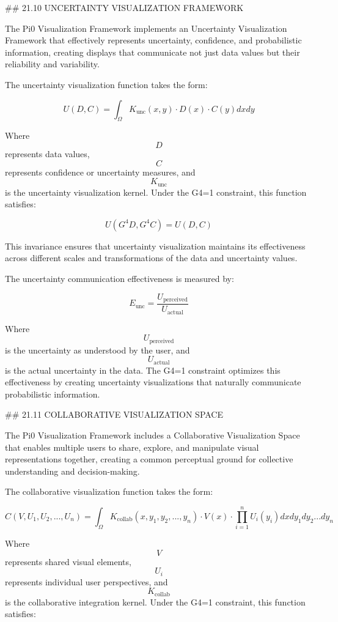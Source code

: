 ## 21.10 UNCERTAINTY VISUALIZATION FRAMEWORK

The Pi0 Visualization Framework implements an Uncertainty Visualization Framework that effectively represents uncertainty, confidence, and probabilistic information, creating displays that communicate not just data values but their reliability and variability.

The uncertainty visualization function takes the form:

$$ U(D, C) = \int_{\Omega} K_{\text{unc}}(x, y) \cdot D(x) \cdot C(y) dx dy $$

Where $$ D $$ represents data values, $$ C $$ represents confidence or uncertainty measures, and $$ K_{\text{unc}} $$ is the uncertainty visualization kernel. Under the G4=1 constraint, this function satisfies:

$$ U(G^4 D, G^4 C) = U(D, C) $$

This invariance ensures that uncertainty visualization maintains its effectiveness across different scales and transformations of the data and uncertainty values.

The uncertainty communication effectiveness is measured by:

$$ E_{\text{unc}} = \frac{U_{\text{perceived}}}{U_{\text{actual}}} $$

Where $$ U_{\text{perceived}} $$ is the uncertainty as understood by the user, and $$ U_{\text{actual}} $$ is the actual uncertainty in the data. The G4=1 constraint optimizes this effectiveness by creating uncertainty visualizations that naturally communicate probabilistic information.

## 21.11 COLLABORATIVE VISUALIZATION SPACE

The Pi0 Visualization Framework includes a Collaborative Visualization Space that enables multiple users to share, explore, and manipulate visual representations together, creating a common perceptual ground for collective understanding and decision-making.

The collaborative visualization function takes the form:

$$ C(V, U_1, U_2, ..., U_n) = \int_{\Omega} K_{\text{collab}}(x, y_1, y_2, ..., y_n) \cdot V(x) \cdot \prod_{i=1}^n U_i(y_i) dx dy_1 dy_2 ... dy_n $$

Where $$ V $$ represents shared visual elements, $$ U_i $$ represents individual user perspectives, and $$ K_{\text{collab}} $$ is the collaborative integration kernel. Under the G4=1 constraint, this function satisfies:

